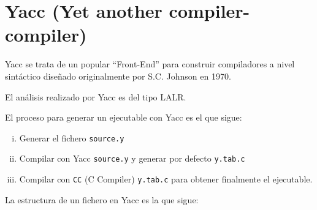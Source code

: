 
\section{Yacc (Yet another compiler-compiler)}

Yacc se trata de un popular ``Front-End'' para construir compiladores a nivel sintáctico diseñado originalmente por S.C. Johnson en 1970. 

El análisis realizado por Yacc es del tipo LALR. 

El proceso para generar un ejecutable con Yacc es el que sigue:

\begin{enumerate}[i.]

\item Generar el fichero \texttt{source.y}

\item Compilar con Yacc \texttt{source.y} y generar por defecto \texttt{y.tab.c}

\item Compilar con \texttt{CC} (C Compiler) \texttt{y.tab.c} para obtener finalmente el ejecutable.

\end{enumerate}

La estructura de un fichero en Yacc es la que sigue:



